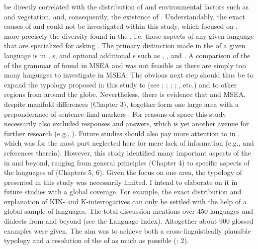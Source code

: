 be directly correlated with the distribution of  and environmental factors such as  and vegetation, and, consequently, the existence of . Understandably, the exact causes of  and  could not be investigated within this study, which focused on , more precisely the diversity found in the \textit{}, i.e. those aspects of any given language that are specialized for asking . The primary distinction made in the  of a given language is in , s, and optional additional s such as , , and . A comparison of the  of the grammar of  found in MSEA and  was not feasible as there are simply too many languages to investigate in MSEA. The obvious next step should thus be to expand the typology proposed in this study to  (see \citealt{Clark1985}; \citealt{Huang1996}; \citealt{Huang1999}; \citealt{Enfield2010}; \citealt{Rajasingh2014}, etc.) and to other regions from around the globe. Nevertheless, there is evidence that  and MSEA, despite manifold differences (Chapter 3), together form one large area with a preponderance of sentence-final  markers \citep{Dryer2013k}. For reasons of space this study necessarily also excluded responses and answers, which is yet another avenue for further research (e.g., \citealt{EnfieldStiversLevinson2010}). Future studies should also pay more attention to  in , which was for the most part neglected here for mere lack of information (e.g., \citealt{Sicoli2014} and references therein). However, this study identified many important aspects of the  in  and beyond, ranging from general principles (Chapter 4) to specific aspects of the languages of  (Chapters 5, 6). Given the focus on one area, the typology of  presented in this study was necessarily limited. I intend to elaborate on it in future studies with a global coverage. For example, the exact distribution and explanation of KIN- and K-interrogatives can only be settled with the help of a global sample of languages. The total discussion mentions over 450 languages and dialects from  and beyond (see the Language Index). Altogether about 900 glossed examples were given. The aim was to achieve both a cross-linguistically plausible typology and a resolution of the  of  as much as possible (\citealt{VoegelinVoegelin1964}: 2).

